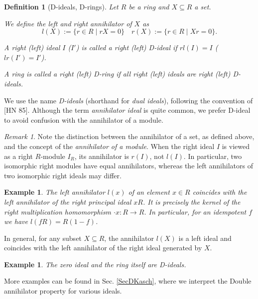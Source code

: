 \documentclass[11pt]{article}
\theoremstyle{plain}
\newtheorem{Ex}[veta]{Example}
\newtheorem{Def}[veta]{Definition}
\theoremstyle{remark}
\newtheorem*{remark}{Remark}
\theoremstyle{plain}
\begin{document}
\begin{Def}[D-ideals, D-rings]\label{DefD}
Let $R$ be a ring and $X\subseteq R$ a set. 

We define the \emph{left and right annihilator of $X$}  as \[l(X):=\{r\in R\mid rX=0 \}\quad r(X):=\{r\in R\mid Xr=0\}.\] 

A right (left) ideal $I$ ($I'$) is called a \emph{right (left) D-ideal} if $rl(I)=I$ ($lr(I')=I'$).


A ring is called a \emph{right (left) D-ring} if all right (left) ideals are right (left) D-ideals.  
\end{Def}
We use the name \textit{D-ideals} (shorthand for \textit{dual ideals}), following the convention of [HN 85]. Although the term \textit{annihilator ideal} is quite common, we prefer D-ideal to avoid confusion with the annihilator of a module.
\begin{remark}
    Note the distinction between the annihilator of a set, as defined above, and the concept of the \textit{annihilator of a module}. When the right ideal $I$ is viewed as a right $R$-module $I_R$, its annihilator is $r(I)$, not $l(I)$. In particular, two isomorphic right modules have equal annihilators, whereas the left annihilators of two isomorphic right ideals may differ. 
\end{remark}
\begin{Ex}
    The left annihilator $l(x)$ of an element $x\in R$ coincides with the left annihilator of the right principal ideal $xR$. It is precisely the kernel of the right multiplication homomorphism $\cdot  x\colon R\to R$. In particular, for an idempotent $f$ we have $l(fR)=R(1-f)$.
\end{Ex}
In general, for any subset $X\subseteq R$, the annihilator $l(X)$ is a left ideal and coincides with the left annihilator of the right ideal generated by $X$. 
\begin{Ex}
 The zero ideal and the ring itself are D-ideals.
\end{Ex}
 More examples can be found in Sec. \ref{SecDKasch}, where we interpret the Double annihilator property for various ideals.
 
\end{document}
